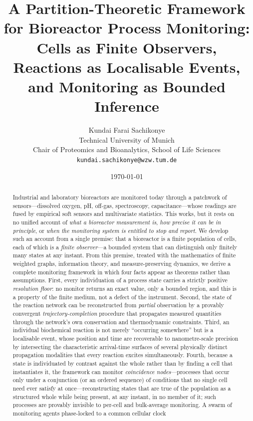 \documentclass[11pt,twocolumn,a4paper]{article}
\title{\textbf{A Partition-Theoretic Framework for Bioreactor Process
Monitoring:\\[3pt] Cells as Finite Observers, Reactions as Localisable
Events, and Monitoring as Bounded Inference}}
\author{%
Kundai Farai Sachikonye\\
\small Technical University of Munich\\
\small Chair of Proteomics and Bioanalytics, School of Life Sciences\\
\small \texttt{kundai.sachikonye@wzw.tum.de}}
\date{\today}
\theoremstyle{thmstyle}
\theoremstyle{definition}
\theoremstyle{remark}
\begin{document}
\maketitle

\begin{abstract}
\noindent
Industrial and laboratory bioreactors are monitored today through a
patchwork of sensors---dissolved oxygen, pH, off-gas, spectroscopy,
capacitance---whose readings are fused by empirical soft sensors and
multivariate statistics. This works, but it rests on no unified account
of \emph{what a bioreactor measurement is}, \emph{how precise it can be
in principle}, or \emph{when the monitoring system is entitled to stop
and report}. We develop such an account from a single premise: that a
bioreactor is a finite population of cells, each of which is a
\emph{finite observer}---a bounded system that can distinguish only
finitely many states at any instant. From this premise, treated with the
mathematics of finite weighted graphs, information theory, and
measure-preserving dynamics, we derive a complete monitoring framework in
which four facts appear as theorems rather than assumptions. First, every
individuation of a process state carries a strictly positive
\emph{resolution floor}: no monitor returns an exact value, only a bounded
region, and this is a property of the finite medium, not a defect of the
instrument. Second, the state of the reaction network can be reconstructed
from \emph{partial} observation by a provably convergent
\emph{trajectory-completion} procedure that propagates measured quantities
through the network's own conservation and thermodynamic constraints.
Third, an individual biochemical reaction is not merely ``occurring
somewhere'' but is a localisable event, whose position and time are
recoverable to nanometre-scale precision by intersecting the
characteristic arrival-time surfaces of several physically distinct
propagation modalities that every reaction excites simultaneously. Fourth,
because a state is individuated by contrast against the whole rather than by
finding a cell that instantiates it, the framework can monitor
\emph{coincidence nodes}---processes that occur only under a conjunction (or
an ordered sequence) of conditions that no single cell need ever satisfy at
once---reconstructing states that are true of the population as a structured
whole while being present, at any instant, in no member of it; such
processes are provably invisible to per-cell and bulk-average monitoring.
A swarm of monitoring agents phase-locked to a common cellular clock

\end{abstract}
\end{document}
